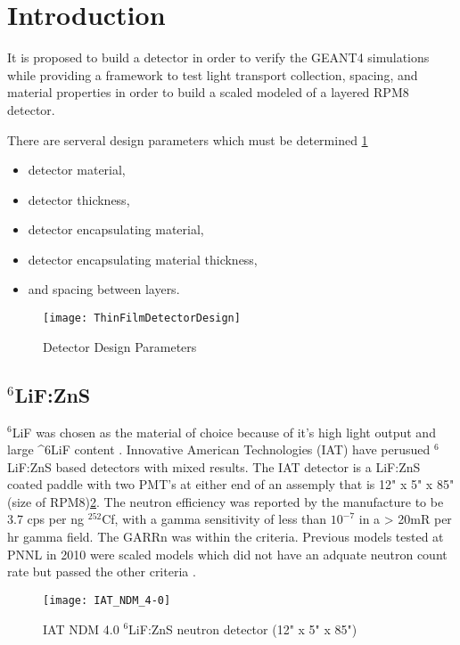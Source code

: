 \section{Introduction}
It is proposed to build a detector in order to verify the GEANT4 simulations while providing a framework to test light transport collection, spacing, and material properties in order to build a scaled modeled of a layered RPM8 detector.

There are serveral design parameters which must be determined \ref{fig:DetectorParameterSchematic}
\begin{itemize}
    \item detector material,
    \item detector thickness,
    \item detector encapsulating material,
    \item detector encapsulating material thickness,
    \item and spacing between layers.
\end{itemize}
\begin{figure}
    \centering
    \texttt{[image: ThinFilmDetectorDesign]}
    \caption{Detector Design Parameters}
    \label{fig:DetectorParameterSchematic}
\end{figure}

\subsection{ ${}^6$LiF:ZnS}
${}^6$LiF was chosen as the material of choice because of it's high light output \cite{}and large {}^{6}LiF content . 
Innovative American Technologies (IAT) have perusued ${}^6$LiF:ZnS based detectors with mixed results.
The IAT detector is a LiF:ZnS coated paddle with two PMT's at either end of an assemply that is 12" x 5" x 85" (size of RPM8)\ref{fig:IATPaddle}.
The neutron efficiency was reported by the manufacture to be 3.7 cps per ng ${}^{252}$Cf, with a gamma sensitivity of less than $10^{-7}$ in a > 20mR per hr gamma field.  The GARRn was within the criteria.
Previous models tested at PNNL in 2010 were scaled models which did not have an adquate neutron count rate but passed the other criteria \cite{kouzes_lithium_2010}.
\begin{figure}
    \centering
    \texttt{[image: IAT\_NDM\_4-0]}
    \caption{IAT NDM 4.0 ${}^6$LiF:ZnS neutron detector (12" x 5" x 85")}
    \label{fig:IATPaddle}
\end{figure}

